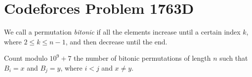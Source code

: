\documentclass[a4paper, 12pt]{article}
\begin{document}
\section*{Codeforces Problem 1763D}

\begin{sidebox}
    \begin{problem}
        We call a permutation \textit{bitonic} if all the elements increase until a certain index \( k \), where \( 2 \le k \le n - 1 \), and then decrease until the end.

        \vspace{0.3cm}

        Count modulo \( 10^9 + 7 \) the number of bitonic permutations of length \( n \) such that \( B_i = x \) and \( B_j = y \), where \( i < j \) and \( x \ne y \).
    \end{problem}
\end{sidebox}
\end{document}
